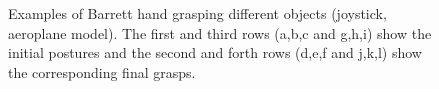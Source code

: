 \begin{figure}

  \caption{  {Examples of Barrett hand grasping different objects (joystick, aeroplane model). The first and third rows (a,b,c and g,h,i) show the initial postures and the second and forth rows (d,e,f and j,k,l) show the corresponding final grasps.}
}
    \label{barrett2}
\end{figure}




